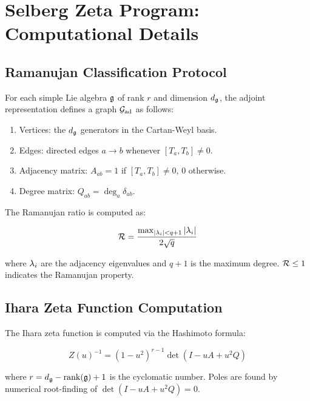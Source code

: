 \appendix

\section{Selberg Zeta Program: Computational Details}\label{app:selberg_details}

\subsection{Ramanujan Classification Protocol}\label{app:ramanujan_protocol}

For each simple Lie algebra $\mathfrak{g}$ of rank $r$ and dimension $d_{\mathfrak{g}}$, the adjoint representation defines a graph $\mathcal{G}_{\mathrm{ad}}$ as follows:

\begin{enumerate}
    \item Vertices: the $d_{\mathfrak{g}}$ generators in the Cartan-Weyl basis.
    \item Edges: directed edges $a \to b$ whenever $[T_a, T_b] \neq 0$.
    \item Adjacency matrix: $A_{ab} = 1$ if $[T_a, T_b] \neq 0$, $0$ otherwise.
    \item Degree matrix: $Q_{ab} = \deg_a \delta_{ab}$.
\end{enumerate}

The Ramanujan ratio is computed as:

\begin{equation}
\mathcal{R} = \frac{\max_{|\lambda_i| < q+1} |\lambda_i|}{2\sqrt{q}}
\end{equation}

where $\lambda_i$ are the adjacency eigenvalues and $q+1$ is the maximum degree. $\mathcal{R} \leq 1$ indicates the Ramanujan property.

\subsection{Ihara Zeta Function Computation}\label{app:ihara_computation}

The Ihara zeta function is computed via the Hashimoto formula:

\begin{equation}
Z(u)^{-1} = (1-u^2)^{r-1} \det(I - uA + u^2 Q)
\end{equation}

where $r = d_{\mathfrak{g}} - \mathrm{rank}(\mathfrak{g}) + 1$ is the cyclomatic number. Poles are found by numerical root-finding of $\det(I - uA + u^2 Q) = 0$.

